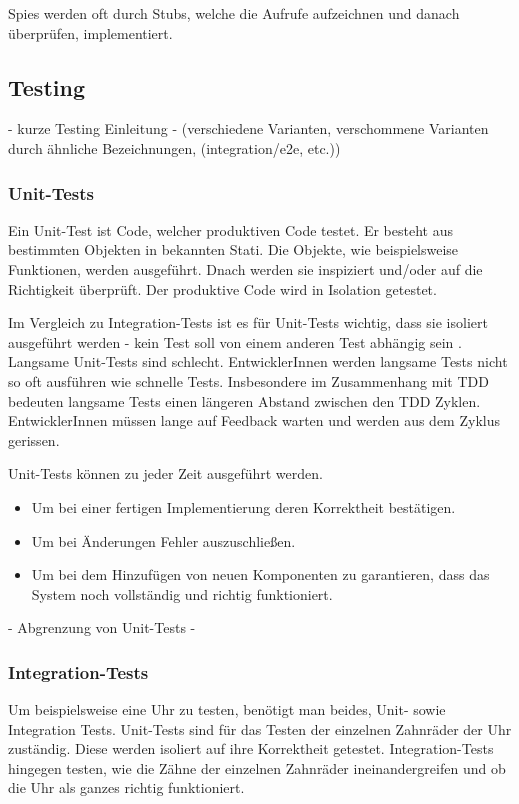 Spies werden oft durch Stubs, welche die Aufrufe aufzeichnen und danach überprüfen, implementiert.

\subsection{Testing}
 - kurze Testing Einleitung - (verschiedene Varianten, verschommene Varianten durch ähnliche Bezeichnungen, (integration/e2e, etc.))

\subsubsection{Unit-Tests}
Ein Unit-Test ist Code, welcher produktiven Code testet. Er besteht aus bestimmten Objekten in bekannten Stati. Die Objekte, wie beispielsweise Funktionen, werden ausgeführt. Dnach werden sie inspiziert und/oder auf die Richtigkeit überprüft. Der produktive Code wird in Isolation getestet.

Im Vergleich zu Integration-Tests ist es für Unit-Tests wichtig, dass sie isoliert ausgeführt werden - kein Test soll von einem anderen Test abhängig sein \autocite[4]{Johansen:2011}. Langsame Unit-Tests sind schlecht. EntwicklerInnen werden langsame Tests nicht so oft ausführen wie schnelle Tests. Insbesondere im Zusammenhang mit TDD bedeuten langsame Tests einen längeren Abstand zwischen den TDD Zyklen. EntwicklerInnen müssen lange auf Feedback warten und werden aus dem Zyklus gerissen.

Unit-Tests können zu jeder Zeit ausgeführt werden.
\begin{itemize}
  \item Um bei einer fertigen Implementierung deren Korrektheit bestätigen.
  \item Um bei Änderungen Fehler auszuschließen.
  \item Um bei dem Hinzufügen von neuen Komponenten zu garantieren, dass das System noch vollständig und richtig funktioniert.
\end{itemize}

 - Abgrenzung von Unit-Tests -

\subsubsection{Integration-Tests}
Um beispielsweise eine Uhr zu testen, benötigt man beides, Unit- sowie Integration Tests. Unit-Tests sind für das Testen der einzelnen Zahnräder der Uhr zuständig. Diese werden isoliert auf ihre Korrektheit getestet. Integration-Tests hingegen testen, wie die Zähne der einzelnen Zahnräder ineinandergreifen und ob die Uhr als ganzes richtig funktioniert.

